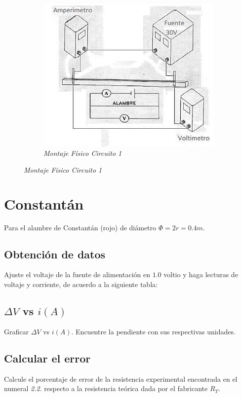 \begin{figure}[H]
    \centering
    \begin{subfigure}[b]{0.8\textwidth}
        \centering
        \includegraphics[width=\textwidth]{Figures/0. General/figure_1_1.png}
        \caption{\textit{Montaje Físico Circuito 1}}
        \label{fig: Montaje Fisico Circuito 1}
    \end{subfigure}
\end{figure}

\section{Constantán}
Para el alambre de Constantán (rojo) de diámetro $\Phi = 2r = 0.4m$.

\subsection{Obtención de datos}
Ajuste el voltaje de la fuente de alimentación en $1.0$ voltio y haga
lecturas de voltaje y corriente, de acuerdo a la siguiente tabla:

\subsection{$\Delta V$ vs $i(A)$}
Graficar $\Delta V$ vs $i(A)$. Encuentre la pendiente con sus respectivas
unidades.

\subsection{Calcular el error}
Calcule el porcentaje de error de la resistencia experimental encontrada en el
numeral \textit{2.2}. respecto a la resistencia teórica dada por el fabricante
$R_{T}$.


